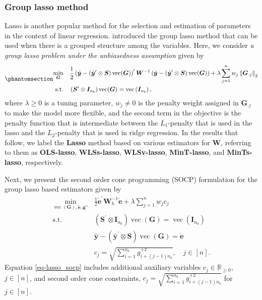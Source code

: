 \documentclass[
  11pt]{article}
\theoremstyle{plain}
\theoremstyle{remark}
\begin{document}
\subsubsection*{Group lasso method}\label{group-lasso-method}

Lasso is another popular method for the selection and estimation of
parameters in the context of linear regression. \citet{Yuan2006-mw}
introduced the group lasso method that can be used when there is a
grouped structure among the variables. Here, we consider \emph{a group
lasso problem under the unbiasedness assumption} given by
\begin{equation}\phantomsection\label{eq-lasso}{
\begin{aligned}
\min_{\bm{G}} \quad & \frac{1}{2}\left(\hat{\bm{y}}-\left(\hat{\bm{y}}^{\prime} \otimes \bm{S}\right) \operatorname{vec}(\bm{G})\right)^{\prime} \bm{W}^{-1}\left(\hat{\bm{y}}-\left(\hat{\bm{y}}^{\prime} \otimes \bm{S}\right) \operatorname{vec}(\bm{G})\right) + \lambda \sum_{j=1}^n w_j \left\|\bm{G}_{\cdot j}\right\|_2 \\
\text{s.t.} \quad & \left(\bm{S}^{\prime} \otimes \bm{I}_{n_b}\right) \operatorname{vec}(\bm{G})=\operatorname{vec}\left(\bm{I}_{n_b}\right),
\end{aligned}
}\end{equation} where \(\lambda \geq 0\) is a tuning parameter,
\(w_j \neq 0\) is the penalty weight assigned in \(\bm{G}_{\cdot j}\) to
make the model more flexible, and the second term in the objective is
the penalty function that is intermediate between the \(L_1\)-penalty
that is used in the lasso and the \(L_2\)-penalty that is used in ridge
regression. In the results that follow, we label the \textbf{Lasso}
method based on various estimators for \(\bm{W}\), referring to them as
\textbf{OLS-lasso}, \textbf{WLSs-lasso}, \textbf{WLSv-lasso},
\textbf{MinT-lasso}, and \textbf{MinTs-lasso}, respectively.

Next, we present the second order cone programming (SOCP) formulation
for the group lasso based estimators given by \begin{align}
\min_{\operatorname{vec}(\bm{G}), \check{\bm{e}}, \bm{g}^{+}} & \frac{1}{2}\check{\bm{e}}^{\prime} \bm{W}_h^{-1}\check{\bm{e}} + \lambda \sum_{j=1}^n w_j c_j \label{eq-lasso_socp}\\
\text{s.t.} \quad & \left(\bm{S}^{\prime} \otimes \bm{I}_{n_b}\right) \operatorname{vec}(\bm{G})=\operatorname{vec}\left(\bm{I}_{n_b}\right) \nonumber \\
& \hat{\bm{y}}-\left(\hat{\bm{y}}^{\prime} \otimes \bm{S}\right) \operatorname{vec}(\bm{G}) = \check{\bm{e}} \nonumber \\
& c_j = \sqrt{\sum_{i=1}^{n_b} g_{i + (j-1) n_b}^{+2}}, \quad j \in[n]. \nonumber
\end{align} Equation \eqref{eq-lasso_socp} includes additional auxiliary
variables \(c_j \in \mathbb{R}_{\geq 0}\), \(j \in [n]\), and second
order cone constraints,
\(c_j = \sqrt{\sum_{i=1}^{n_b} g_{i + (j-1) n_b}^{+2}}\) for
\(j \in[n]\).
\end{document}
